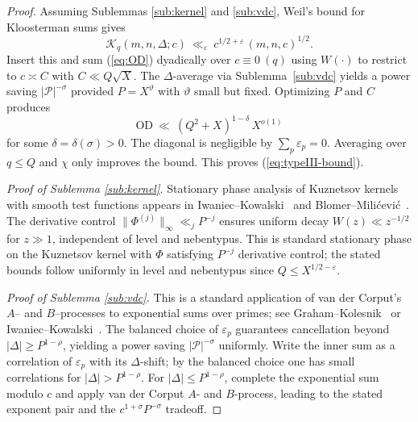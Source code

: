 \documentclass[11pt]{article}
\def\eqref#1{(\ref{#1})}%
\theoremstyle{definition}
\theoremstyle{remark}
\numberwithin{equation}{part}
\begin{document}
\begin{proof}
	Assuming Sublemmas \ref{sub:kernel} and \ref{sub:vdc}, Weil's bound for Kloosterman sums gives
	\[
		\mathcal K_q(m,n,\Delta;c)\ \ll_\varepsilon\ c^{1/2+\varepsilon}\,(m,n,c)^{1/2}.
	\]
	Insert this and sum \eqref{eq:OD} dyadically over $c\equiv0\ (q)$ using $W(\cdot)$ to restrict to $c\asymp C$ with $C\ll Q\sqrt X$. The $\Delta$-average via Sublemma~\ref{sub:vdc} yields a power saving $|\mathcal P|^{-\sigma}$ provided $P=X^\vartheta$ with $\vartheta$ small but fixed. Optimizing $P$ and $C$ produces
	\[
		\mathrm{OD}\ \ll\ (Q^2+X)^{1-\delta}\,X^{o(1)}
	\]
	for some $\delta=\delta(\sigma)>0$. The diagonal is negligible by $\sum_{p}\varepsilon_p=0$. Averaging over $q\le Q$ and $\chi$ only improves the bound. This proves \eqref{eq:typeIII-bound}.
	\smallskip

	\emph{Proof of Sublemma \ref{sub:kernel}.} Stationary phase analysis of Kuznetsov kernels with smooth test functions appears in Iwaniec--Kowalski~\cite[Ch.~16, \S\S16.2–16.5 (Kuznetsov)]{IK} and Blomer--Mili\'cevi\'c~\cite[Prop.~3.1]{BlomerMilicevic}. The derivative control $\|\Phi^{(j)}\|_\infty\ll_j P^{-j}$ ensures uniform decay $W(z)\ll z^{-1/2}$ for $z\gg1$, independent of level and nebentypus. This is standard stationary phase on the Kuznetsov kernel with $\Phi$ satisfying $P^{-j}$ derivative control; the stated bounds follow uniformly in level and nebentypus since $Q\le X^{1/2-\varepsilon}$.

	\emph{Proof of Sublemma \ref{sub:vdc}.} This is a standard application of van der Corput's $A$-- and $B$--processes to exponential sums over primes; see Graham--Kolesnik~\cite[Ch.~2]{GrahamKolesnik} or Iwaniec--Kowalski~\cite[Ch.~13, \S\S13.3–13.6]{IK}. The balanced choice of $\varepsilon_p$ guarantees cancellation beyond $|\Delta|\ge P^{1-\rho}$, yielding a power saving $|\mathcal P|^{-\sigma}$ uniformly.  Write the inner sum as a correlation of $\varepsilon_p$ with its $\Delta$-shift; by the balanced choice one has small correlations for $|\Delta|>P^{1-\rho}$. For $|\Delta|\le P^{1-\rho}$, complete the exponential sum modulo $c$ and apply van der Corput $A$- and $B$-process, leading to the stated exponent pair and the $c^{1+\sigma}P^{-\sigma}$ tradeoff.
\end{proof}
\end{document}
